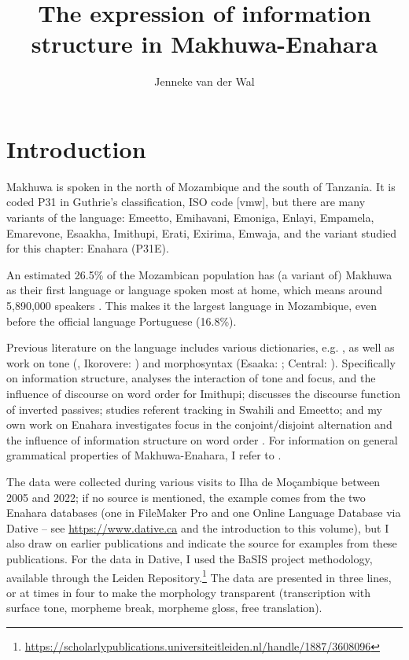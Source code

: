 \documentclass[output=paper]{langscibook}
\author{Jenneke van der Wal\orcid{}\affiliation{Leiden University}}
\title{The expression of information structure in Makhuwa-Enahara}
\begin{document}
\maketitle
\label{ch:8}



\section{Introduction}

Makhuwa is spoken in the north of Mozambique and the south of Tanzania. It is coded P31 in Guthrie’s classification, ISO code [vmw], but there are many variants of the language: Emeetto, Emihavani, Emoniga, Enlayi, Empamela, Emarevone, Esaakha, Imithupi, Erati, Exirima, Emwaja, and the variant studied for this chapter: Enahara (P31E).

An estimated 26.5\% of the Mozambican population has (a variant of) Makhuwa as their first language or language spoken most at home, which means around 5,890,000 speakers \citep{INE2017}. This makes it the largest language in Mozambique, even before the official language Portuguese (16.8\%).

Previous literature on the language includes various dictionaries, e.g. \citet{PiresPrata1960,PiresPrata1973,PiresPrata1990}, as well as work on tone (\citealt{CassimjeeKisseberth1999}, Ikorovere: \citealt{ChengKisseberth1979,ChengKisseberth1980,ChengKisseberth1981,ChengKisseberth1982}) and morphosyntax (Esaaka: \citealt{Katupha1983,Katupha1991}; Central: \citealt{Centis2001}). Specifically on information structure, \citet{Stucky1979,Stucky1979a,Stucky1985} analyses the interaction of tone and focus, and the influence of discourse on word order for Imithupi; \citet{Kröger2010} discusses the discourse function of inverted passives; \citet{Poeta2016} studies referent tracking in Swahili and Emeetto; and my own work on Enahara investigates focus in the conjoint/disjoint alternation \citep{vanderWal2009a,vanderWal2011,vanderWal2014} and the influence of information structure on word order \citep{vanderWal2008,vanderWal2009a,vanderWal2012a}. For information on general grammatical properties of Makhuwa-Enahara, I refer to \citet[chapter 2]{vanderWal2009a}.

The data were collected during various visits to Ilha de Moçambique between 2005 and 2022; if no source is mentioned, the example comes from the two Enahara databases (one in FileMaker Pro and one Online Language Database via Dative – see \url{https://www.dative.ca} and the introduction to this volume), but I also draw on earlier publications and indicate the source for examples from these publications. For the data in Dative, I used the BaSIS project methodology, available through the Leiden Repository.\footnote{\url{https://scholarlypublications.universiteitleiden.nl/handle/1887/3608096}} The data are presented in three lines, or at times in four to make the morphology transparent (transcription with surface tone, morpheme break, morpheme gloss, free translation).
\end{document}
